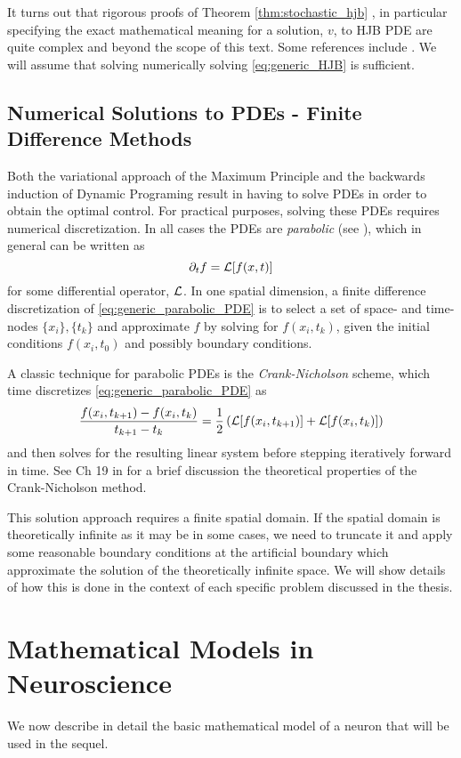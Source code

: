 It turns out that rigorous proofs of Theorem
\ref{thm:stochastic_hjb} , in particular specifying the exact
mathematical meaning for a solution, $v$, to HJB PDE are quite complex and beyond the scope
of this text. Some references include \cite{Krylov2008,Fleming2006}. We will
assume that solving numerically solving \cref{eq:generic_HJB} is sufficient. 

\subsection{Numerical Solutions to PDEs - Finite Difference Methods}
Both the variational approach of the Maximum Principle and the backwards
induction of Dynamic Programing result in having to solve PDEs in order to
obtain the optimal control. For practical purposes, solving these PDEs requires
numerical discretization. In all cases the PDEs are {\sl
parabolic} (see \cite{Press1992}), which in general can be written as 
\begin{equation}
{\partial}_t f = { \mathcal{L} }[f(x,t)]
\label{eq:generic_parabolic_PDE}
\end{equation}
for some differential operator, ${ \mathcal{L} }$. 
In one spatial dimension, a finite difference discretization of
\cref{eq:generic_parabolic_PDE} is to select a set of space- and time- nodes
$\{x_i\}, \{t_k\}$ and approximate $f$ by solving for $f(x_i, t_k)$, given the
initial conditions $f(x_i, t_0)$ and possibly boundary conditions.

A classic technique for parabolic PDEs is the
{\sl Crank-Nicholson} scheme, which time discretizes
\cref{eq:generic_parabolic_PDE} as
$$
\frac{f(x_i, t_{k+1})- f(x_i, t_k)}{ t_{k+1}-t_k}
=
\frac 12 \left({ \mathcal{L} }[f(x_i, t_{k+1}  )] + { \mathcal{L} }[f(x_i, t_k)]
\right)
$$
and then solves for the resulting linear system before stepping
iteratively forward in time. See Ch 19 in \cite{Press1992} for a brief
discussion the theoretical properties of the Crank-Nicholson method.   

This solution approach requires a finite spatial domain. If the spatial domain
is theoretically infinite as it may be in some cases, we need to truncate it and
apply some reasonable boundary conditions at the artificial boundary which
approximate the solution of the theoretically infinite space. We will show
details of how this is done in the context of each specific problem
discussed in the thesis.  
 
 
 
\section{Mathematical Models in Neuroscience}
\label{sec:math_models_in_neuroscience}
We now describe in detail the basic mathematical model of a neuron that will be
used in the sequel. 

